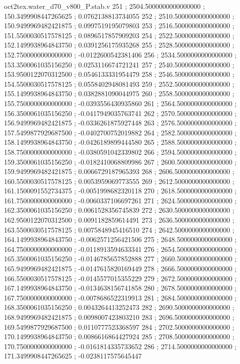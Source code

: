 \begin{filecontents}[overwrite]{oct2tex.water_d70_v800_P.stab.v}
251 ; 2504.5000000000000000 ; 150.3499908447265625 ; 0.0762138813734055
252 ; 2510.5000000000000000 ; 150.9499969482421875 ; 0.0997519195079803
253 ; 2516.5000000000000000 ; 151.5500030517578125 ; 0.0896517857909203
254 ; 2522.5000000000000000 ; 152.1499938964843750 ; 0.0391256175935268
255 ; 2528.5000000000000000 ; 152.7500000000000000 ; -0.0122600542381406
256 ; 2534.5000000000000000 ; 153.3500061035156250 ; 0.0253116674721241
257 ; 2540.5000000000000000 ; 153.9500122070312500 ; 0.0546133331954479
258 ; 2546.5000000000000000 ; 154.5500030517578125 ; 0.0558402948081493
259 ; 2552.5000000000000000 ; 155.1499938964843750 ; 0.0382881090044975
260 ; 2558.5000000000000000 ; 155.7500000000000000 ; -0.0393556430935860
261 ; 2564.5000000000000000 ; 156.3500061035156250 ; -0.0417949035763741
262 ; 2570.5000000000000000 ; 156.9499969482421875 ; -0.0336261875927448
263 ; 2576.5000000000000000 ; 157.5499877929687500 ; -0.0402700752019882
264 ; 2582.5000000000000000 ; 158.1499938964843750 ; -0.0426189899444580
265 ; 2588.5000000000000000 ; 158.7500000000000000 ; -0.0380591042339802
266 ; 2594.5000000000000000 ; 159.3500061035156250 ; -0.0182410068809986
267 ; 2600.5000000000000000 ; 159.9499969482421875 ; 0.0066729187965393
268 ; 2606.5000000000000000 ; 160.5500030517578125 ; 0.0053959069773555
269 ; 2612.5000000000000000 ; 161.1500091552734375 ; -0.0051998682320118
270 ; 2618.5000000000000000 ; 161.7500000000000000 ; -0.0060337106697261
271 ; 2624.5000000000000000 ; 162.3500061035156250 ; 0.0061528356745839
272 ; 2630.5000000000000000 ; 162.9500122070312500 ; 0.0091182859614491
273 ; 2636.5000000000000000 ; 163.5500030517578125 ; 0.0075848945416510
274 ; 2642.5000000000000000 ; 164.1499938964843750 ; -0.0062571256421506
275 ; 2648.5000000000000000 ; 164.7500000000000000 ; -0.0118913594633341
276 ; 2654.5000000000000000 ; 165.3500061035156250 ; -0.0146785657852888
277 ; 2660.5000000000000000 ; 165.9499969482421875 ; -0.0147615820169449
278 ; 2666.5000000000000000 ; 166.5500030517578125 ; -0.0145577015355229
279 ; 2672.5000000000000000 ; 167.1499938964843750 ; -0.0134638156741858
280 ; 2678.5000000000000000 ; 167.7500000000000000 ; -0.0078686522319913
281 ; 2684.5000000000000000 ; 168.3500061035156250 ; 0.0043264413252473
282 ; 2690.5000000000000000 ; 168.9499969482421875 ; 0.0098007423803210
283 ; 2696.5000000000000000 ; 169.5499877929687500 ; 0.0110777523368597
284 ; 2702.5000000000000000 ; 170.1499938964843750 ; 0.0086616864427924
285 ; 2708.5000000000000000 ; 170.7500000000000000 ; -0.0161814335733652
286 ; 2714.5000000000000000 ; 171.3499908447265625 ; -0.0238117575645447

\end{filecontents}
